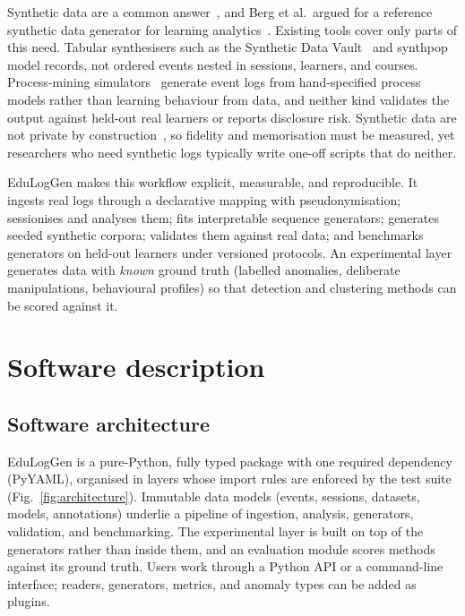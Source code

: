 \documentclass[preprint,12pt]{elsarticle}
\begin{document}
Synthetic data are a common answer~\cite{jordon2022synthetic}, and Berg et
al.\ argued for a reference synthetic data generator for learning
analytics~\cite{berg2016reference}. Existing tools cover only parts of this
need. Tabular synthesisers such as the Synthetic Data Vault~\cite{patki2016sdv}
and synthpop~\cite{nowok2016synthpop} model records, not ordered events
nested in sessions, learners, and courses. Process-mining
simulators~\cite{vanderaalst2016process} generate event logs from
hand-specified process models rather than learning behaviour from data, and
neither kind validates the output against held-out real learners or reports
disclosure risk. Synthetic data are not private by
construction~\cite{stadler2022groundhog}, so fidelity and memorisation must
be measured, yet researchers who need synthetic logs typically write one-off
scripts that do neither.

EduLogGen makes this workflow explicit, measurable, and reproducible. It
ingests real logs through a declarative mapping with pseudonymisation;
sessionises and analyses them; fits interpretable sequence generators;
generates seeded synthetic corpora; validates them against real data; and
benchmarks generators on held-out learners under versioned protocols. An
experimental layer generates data with \emph{known} ground truth (labelled
anomalies, deliberate manipulations, behavioural profiles) so that detection
and clustering methods can be scored against it.

\section{Software description}

\subsection{Software architecture}

EduLogGen is a pure-Python, fully typed package with one required dependency
(PyYAML), organised in layers whose import rules are enforced by the test
suite (Fig.~\ref{fig:architecture}). Immutable data models (events, sessions,
datasets, models, annotations) underlie a pipeline of ingestion, analysis,
generators, validation, and benchmarking. The experimental layer is built on
top of the generators rather than inside them, and an evaluation module
scores methods against its ground truth. Users work through a Python API or a
command-line interface; readers, generators, metrics, and anomaly types can
be added as plugins.
\end{document}
